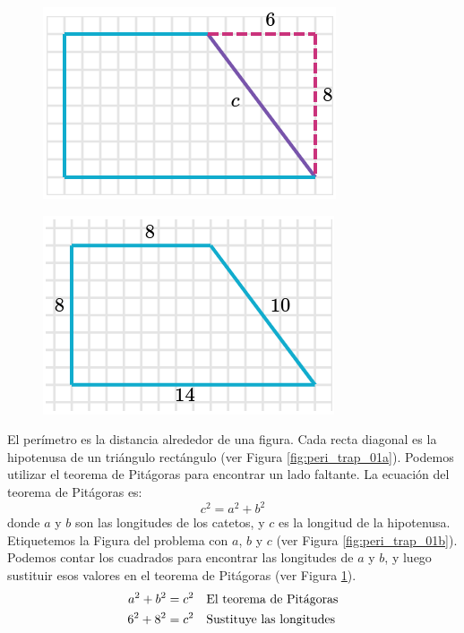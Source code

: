 \begin{solutionbox}{16cm}
\begin{minipage}{0.4\textwidth}
\begin{figure}[H]
            \centering
            \includegraphics[width=0.5\linewidth]{../images/peri_trap_01c.png}
            \caption{}
            \label{fig:peri_trap_01c}
        \end{figure}
        \begin{figure}[H]
            \centering
            \includegraphics[width=0.5\linewidth]{../images/peri_trap_01d.png}
            \caption{}
            \label{fig:peri_trap_01d}
        \end{figure}
    \end{minipage}\hfill
    \begin{minipage}{0.55\textwidth}
        El perímetro es la distancia alrededor de una figura.
        Cada recta diagonal es la hipotenusa de un triángulo rectángulo (ver Figura \ref{fig:peri_trap_01a}).
        Podemos utilizar el teorema de Pitágoras para encontrar un lado faltante.
        La ecuación del teorema de Pitágoras es:
        \[c^2=a^2+b^2\]
        donde $a$ y $b$ son las longitudes de los catetos, y $c$ es la longitud de la hipotenusa.
        Etiquetemos la Figura del problema con $a$, $b$ y $c$ (ver Figura \ref{fig:peri_trap_01b}).
        Podemos contar los cuadrados para encontrar las longitudes de $a$ y $b$, y luego sustituir esos valores en el teorema de Pitágoras (ver Figura \ref{fig:peri_trap_01c}).
        \begin{align*}
            a^2+b^2  =c^2 & \text{\quad El teorema de Pitágoras}                          \\
            6^2+8^2  =c^2 & \text{\quad Sustituye las longitudes}                         \\

\end{align*}
\end{minipage}
\end{solutionbox}

